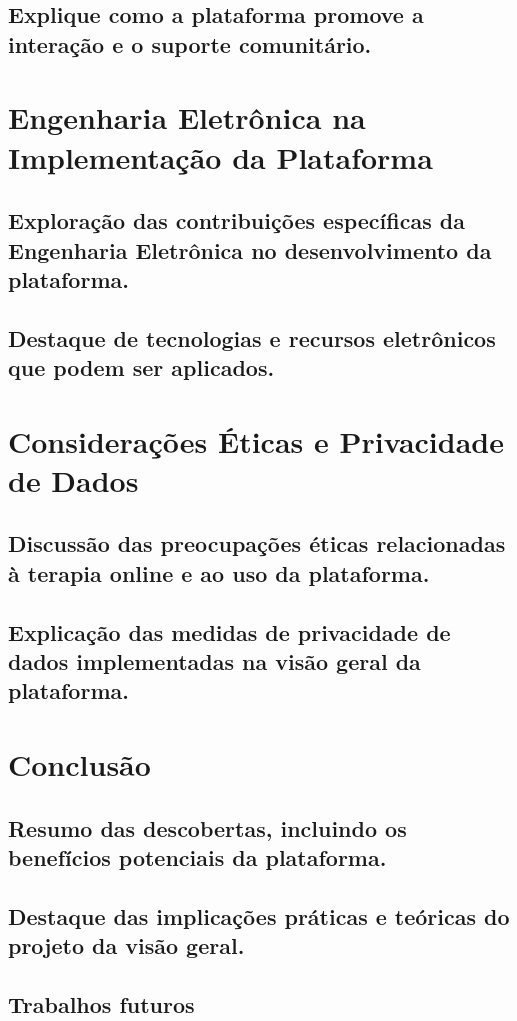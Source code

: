 \subsection{Explique como a plataforma promove a interação e o suporte comunitário.}
\section{Engenharia Eletrônica na Implementação da Plataforma}
\subsection{Exploração das contribuições específicas da Engenharia Eletrônica no desenvolvimento da plataforma.}
\subsection{Destaque de tecnologias e recursos eletrônicos que podem ser aplicados.}
\section{Considerações Éticas e Privacidade de Dados}
\subsection{Discussão das preocupações éticas relacionadas à terapia online e ao uso da plataforma.}
\subsection{Explicação das medidas de privacidade de dados implementadas na visão geral da plataforma.}
\section{Conclusão}
\subsection{Resumo das descobertas, incluindo os benefícios potenciais da plataforma.}
\subsection{Destaque das implicações práticas e teóricas do projeto da visão geral.}
\subsection{Trabalhos futuros}


